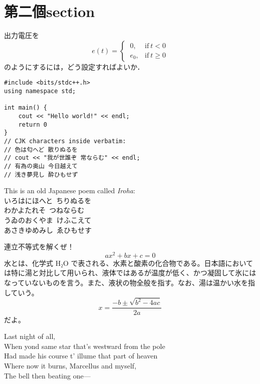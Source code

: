 \section{第二個section}

\begin{tcolorbox}[colback=myteal!5!white,colframe=myteal!75!black,title=\textsf{課題2}]
	出力電圧を
	\begin{equation*}
		e(t) =
		\begin{cases}
			\ 0,   & \text{if}\ t < 0   \\
			\ e_0, & \text{if}\ t \ge 0
		\end{cases}
	\end{equation*}
	のようにするには，どう設定すればよいか．
\end{tcolorbox}

\begin{verbatim}
#include <bits/stdc++.h>
using namespace std;

int main() {
	cout << "Hello world!" << endl;
	return 0
}
// CJK characters inside verbatim:
// 色は匂へど 散りぬるを
// cout << "我が世誰ぞ 常ならむ" << endl;
// 有為の奥山 今日越えて
// 浅き夢見し 酔ひもせず

\end{verbatim}

This is an old Japanese poem called \emph{Iroha}: \\
いろはにほへと\ ちりぬるを \\
わかよたれそ\ つねならむ \\
うゐのおくやま\ けふこえて \\
あさきゆめみし\ ゑひもせす

連立不等式を解くぜ！
\begin{equation}
	ax^2 + bx + c = 0
\end{equation}
水とは、化学式 H₂O で表される、水素と酸素の化合物である。日本語においては特に湯と対比して用いられ、液体ではあるが温度が低く、かつ凝固して氷にはなっていないものを言う。また、液状の物全般を指す。なお、湯は温かい水を指していう。
\begin{equation}
	x = \frac{-b \pm \sqrt{b^2 - 4ac}}{2a}
\end{equation}
だよ。

Last night of all, \\
When yond same star that's westward from the pole \\
Had made his course t' illume that part of heaven \\
Where now it burns, Marcellus and myself, \\
The bell then beating one—
